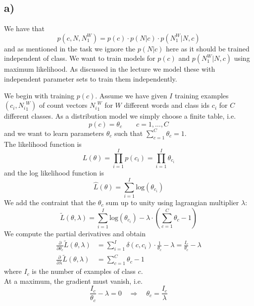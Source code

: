 \documentclass[%
   11pt,              %
   ngerman,           %
   a4paper,           %
   DIV11,             %
]{scrartcl}%
\begin{document}
\subsection*{a)}
We have that 
\begin{equation*}
	p(c, N, N_1^W) = p(c) \cdot p(N|c) \cdot p(N_1^W|N,c)
\end{equation*}
and as mentioned in the task we ignore the $p(N|c)$ here as it should be trained independent of class. We want to train models for $p(c)$ and $p(N_1^W|N,c)$ using maximum likelihood. As discussed in the lecture we model these with independent parameter sets to train them independently. \par
We begin with training $p(c)$. Assume we have given $I$ training examples $(c_i, {N_i}_1^W)$ of count vectors ${N_i}_1^W$ for $W$ different words and class ids $c_i$ for $C$ different classes. As a distribution model we simply choose a finite table, i.e.
\begin{equation}\label{const}
	p(c) = \theta_c \qquad c = 1,\ldots,C
\end{equation} 
and we want to learn parameters $\theta_c$ such that $\sum_{c=1}^C \theta_c = 1$. \\
The likelihood function is 
\begin{equation*}
	L(\theta) = \prod_{i=1}^I p(c_i) = \prod_{i=1}^I \theta_{c_i}
\end{equation*}
and the log likelihood function is
\begin{equation*}
	\hat{L}(\theta) = \sum_{i=1}^I \text{log}(\theta_{c_i})
\end{equation*}
We add the contraint that the $\theta_c$ sum up to unity using lagrangian multiplier $\lambda$:
\begin{equation*}
	\tilde{L}(\theta, \lambda) = \sum_{i=1}^I \text{log}(\theta_{c_i}) - \lambda \cdot (\sum_{c=1}^C \theta_c - 1)
\end{equation*}
We compute the partial derivatives and obtain
\begin{align*}
	\frac{\partial}{\partial \theta_c} \tilde{L}(\theta, \lambda) &= \sum_{i=1}^I \delta(c,c_i) \cdot \frac{1}{\theta_c} - \lambda = \frac{I_c}{\theta_c} - \lambda \\
	\frac{\partial}{\partial \lambda} \tilde{L}(\theta, \lambda) &= \sum_{c=1}^C \theta_c - 1
\end{align*}
where $I_c$ is the number of examples of class $c$. \\
At a maximum, the gradient must vanish, i.e.
\begin{equation}\label{subs}
	\frac{I_c}{\theta_c} - \lambda = 0 \quad \Rightarrow \quad \theta_c = \frac{I_c}{\lambda}
\end{equation}
\end{document}
